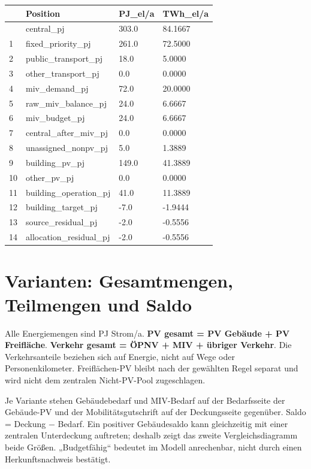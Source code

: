 \documentclass[
  ngerman,
  a4paper,
  DIV=11]{scrreprt}
\newcounter{none} %
\begin{document}
{\def\LTcaptype{none} %
\begin{longtable}[]{@{}llll@{}}
\toprule\noalign{}
& Position & PJ\_el/a & TWh\_el/a \\
\midrule\noalign{}
\endhead
\bottomrule\noalign{}
\endlastfoot
0 & central\_pj & 303.0 & 84.1667 \\
1 & fixed\_priority\_pj & 261.0 & 72.5000 \\
2 & public\_transport\_pj & 18.0 & 5.0000 \\
3 & other\_transport\_pj & 0.0 & 0.0000 \\
4 & miv\_demand\_pj & 72.0 & 20.0000 \\
5 & raw\_miv\_balance\_pj & 24.0 & 6.6667 \\
6 & miv\_budget\_pj & 24.0 & 6.6667 \\
7 & central\_after\_miv\_pj & 0.0 & 0.0000 \\
8 & unassigned\_nonpv\_pj & 5.0 & 1.3889 \\
9 & building\_pv\_pj & 149.0 & 41.3889 \\
10 & other\_pv\_pj & 0.0 & 0.0000 \\
11 & building\_operation\_pj & 41.0 & 11.3889 \\
12 & building\_target\_pj & -7.0 & -1.9444 \\
13 & source\_residual\_pj & -2.0 & -0.5556 \\
14 & allocation\_residual\_pj & -2.0 & -0.5556 \\
\end{longtable}
}

\section{Varianten: Gesamtmengen, Teilmengen und
Saldo}\label{varianten-gesamtmengen-teilmengen-und-saldo}

Alle Energiemengen sind PJ Strom/a. \textbf{PV gesamt = PV Gebäude + PV
Freifläche}. \textbf{Verkehr gesamt = ÖPNV + MIV + übriger Verkehr}. Die
Verkehrsanteile beziehen sich auf Energie, nicht auf Wege oder
Personenkilometer. Freiflächen-PV bleibt nach der gewählten Regel
separat und wird nicht dem zentralen Nicht-PV-Pool zugeschlagen.

Je Variante stehen Gebäudebedarf und MIV-Bedarf auf der Bedarfsseite der
Gebäude-PV und der Mobilitätsgutschrift auf der Deckungsseite gegenüber.
Saldo = Deckung − Bedarf. Ein positiver Gebäudesaldo kann gleichzeitig
mit einer zentralen Unterdeckung auftreten; deshalb zeigt das zweite
Vergleichsdiagramm beide Größen. „Budgetfähig`` bedeutet im Modell
anrechenbar, nicht durch einen Herkunftsnachweis bestätigt.
\end{document}
